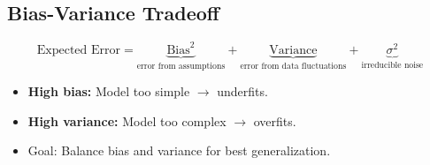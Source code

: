 \subsection*{Bias-Variance Tradeoff}

\begin{definition}
\[
\text{Expected Error} = \underbrace{\text{Bias}^2}_{\text{error from assumptions}} + \underbrace{\text{Variance}}_{\text{error from data fluctuations}} + \underbrace{\sigma^2}_{\text{irreducible noise}}
\]
\end{definition}

\begin{itemize}
    \item \textbf{High bias:} Model too simple $\rightarrow$ underfits.
    \item \textbf{High variance:} Model too complex $\rightarrow$ overfits.
    \item Goal: Balance bias and variance for best generalization.
\end{itemize}
